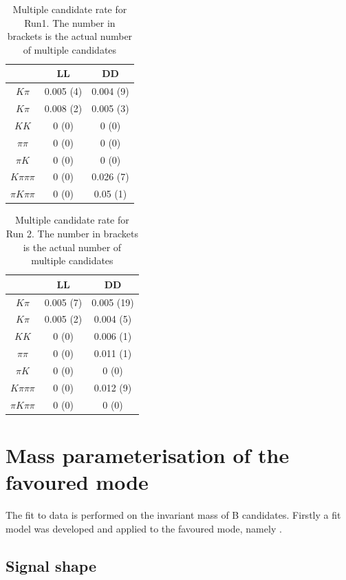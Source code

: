 \begin{table}[h]
\centering
\begin{tabular}{ccc}
\hline
& LL & DD \\
\hline
$K\pi$ & 0.005 (4) & 0.004 (9) \\
$K\pi$ & 0.008 (2) & 0.005 (3) \\
$KK$ & 0 (0) & 0 (0) \\
$\pi\pi$ & 0 (0) & 0 (0) \\
$\pi K$ & 0 (0) & 0 (0) \\
$K\pi\pi\pi$ & 0 (0) & 0.026 (7) \\
$\pi K\pi\pi$ & 0 (0) & 0.05 (1) \\
\hline
\end{tabular}
\caption{Multiple candidate rate for Run1. The number in brackets is the actual number of multiple candidates}
\label{multiplecandidatesRun1}
\end{table}

\begin{table}[h]
\centering
\begin{tabular}{ccc}
\hline
& LL & DD \\
\hline
$K\pi$ & 0.005 (7) & 0.005 (19) \\
$K\pi$ & 0.005 (2) & 0.004 (5) \\
$KK$ & 0 (0) & 0.006 (1) \\
$\pi\pi$ & 0 (0) & 0.011 (1) \\
$\pi K$ & 0 (0) & 0 (0) \\
$K\pi\pi\pi$ & 0 (0) & 0.012 (9) \\
$\pi K\pi\pi$ & 0 (0) & 0 (0) \\
\hline
\end{tabular}
\caption{Multiple candidate rate for Run 2. The number in brackets is the actual number of multiple candidates}
\label{multiplecandidatesRun2}
\end{table}

\clearpage

\section{Mass parameterisation of the favoured mode}
\label{sec:massfit}

The fit to data is performed on the invariant mass of B candidates. Firstly a fit model was developed and applied to the favoured mode, namely \decay{\Bm}{\D(\Km\pip)\Kstarm}.

\subsection{Signal shape}
\label{sec:massfit:signal}

